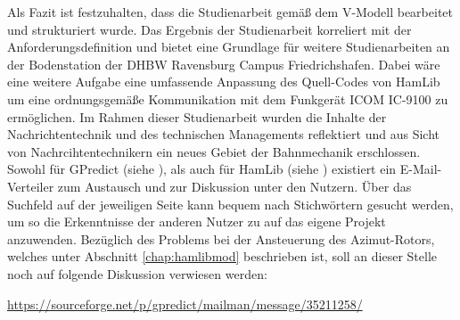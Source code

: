 Als Fazit ist festzuhalten, dass die Studienarbeit gemäß dem V-Modell bearbeitet und strukturiert wurde. Das Ergebnis der Studienarbeit korreliert mit der Anforderungsdefinition und bietet eine Grundlage für weitere Studienarbeiten an der Bodenstation der DHBW Ravensburg Campus Friedrichshafen. Dabei wäre eine weitere Aufgabe eine umfassende Anpassung des Quell-Codes von HamLib um eine ordnungsgemäße Kommunikation mit dem Funkgerät ICOM IC-9100 zu ermöglichen.\newpar
Im Rahmen dieser Studienarbeit wurden die Inhalte der Nachrichtentechnik und des technischen Managements reflektiert und aus Sicht von Nachrcihtentechnikern ein neues Gebiet der Bahnmechanik erschlossen.\newpar
Sowohl für GPredict (siehe \cite{gpredictmailman}), als auch für HamLib (siehe \cite{hamlibmailman}) existiert ein E-Mail-Verteiler zum Austausch und zur Diskussion unter den Nutzern. Über das Suchfeld auf der jeweiligen Seite kann bequem nach Stichwörtern gesucht werden, um so die Erkenntnisse der anderen Nutzer zu auf das eigene Projekt anzuwenden. Bezüglich des Problems bei der Ansteuerung des Azimut-Rotors, welches unter Abschnitt \ref{chap:hamlibmod} beschrieben ist, soll an dieser Stelle noch auf folgende Diskussion verwiesen werden:

\url{https://sourceforge.net/p/gpredict/mailman/message/35211258/}

\clearpage
